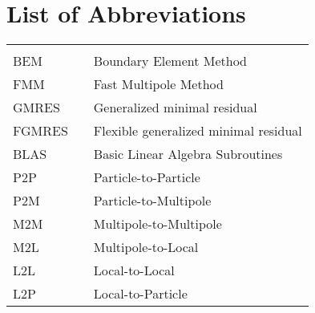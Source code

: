 \tableofcontents
\cleardoublepage


\newpage
\listoffigures
\cleardoublepage

\chapter*{List of Abbreviations}
\begin{center}
  \begin{tabular}{lll}
    \hspace*{2em} & \hspace*{1in} & \hspace*{4.5in} \\
    BEM  & \dotfill & Boundary Element Method \\
    FMM  & \dotfill & Fast Multipole Method \\
    GMRES & \dotfill & Generalized minimal residual \\
    FGMRES & \dotfill & Flexible generalized minimal residual \\
    BLAS & \dotfill & Basic Linear Algebra Subroutines \\
    P2P & \dotfill & Particle-to-Particle \\
    P2M & \dotfill & Particle-to-Multipole \\
    M2M & \dotfill & Multipole-to-Multipole \\
    M2L & \dotfill & Multipole-to-Local \\
    L2L & \dotfill & Local-to-Local \\
    L2P & \dotfill & Local-to-Particle
  \end{tabular}
\end{center}
\cleardoublepage

\newpage
\listofalgorithms
\cleardoublepage


\newpage
\endofprelim
